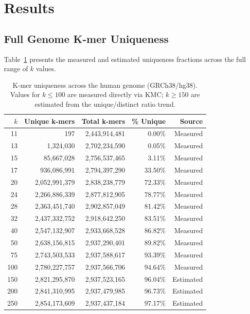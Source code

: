\documentclass[11pt,a4paper]{article}
\begin{document}
\section{Results}

\subsection{Full Genome K-mer Uniqueness}

Table~\ref{tab:results} presents the measured and estimated uniqueness fractions across the full range of $k$ values.

\begin{table}[H]
\centering
\caption{K-mer uniqueness across the human genome (GRCh38/hg38). Values for $k \leq 100$ are measured directly via KMC; $k \geq 150$ are estimated from the unique/distinct ratio trend.}
\begin{tabular}{rrrrr}
\toprule
$k$ & \textbf{Unique k-mers} & \textbf{Total k-mers} & \textbf{\% Unique} & \textbf{Source} \\
\midrule
11  & 197              & 2,443,914,481 & 0.00\%  & Measured \\
13  & 1,324,030        & 2,702,234,590 & 0.05\%  & Measured \\
15  & 85,667,028       & 2,756,537,465 & 3.11\%  & Measured \\
17  & 936,086,991      & 2,794,397,290 & 33.50\% & Measured \\
20  & 2,052,991,379    & 2,838,238,779 & 72.33\% & Measured \\
24  & 2,266,886,339    & 2,877,812,905 & 78.77\% & Measured \\
28  & 2,363,451,740    & 2,902,857,049 & 81.42\% & Measured \\
32  & 2,437,332,752    & 2,918,642,250 & 83.51\% & Measured \\
40  & 2,547,132,907    & 2,933,668,528 & 86.82\% & Measured \\
50  & 2,638,156,815    & 2,937,290,401 & 89.82\% & Measured \\
75  & 2,743,503,533    & 2,937,588,617 & 93.39\% & Measured \\
100 & 2,780,227,757    & 2,937,566,706 & 94.64\% & Measured \\
150 & 2,821,295,870    & 2,937,523,165 & 96.04\% & Estimated \\
200 & 2,841,310,995    & 2,937,479,985 & 96.73\% & Estimated \\
250 & 2,854,173,609    & 2,937,437,184 & 97.17\% & Estimated \\
\bottomrule
\end{tabular}
\label{tab:results}
\end{table}
\end{document}
